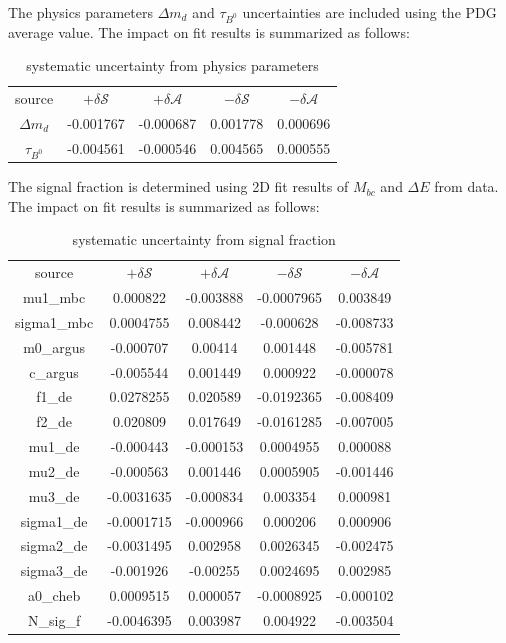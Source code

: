 The physics parameters $\Delta m_d$ and $\tau_{B^0}$ uncertainties are included using the PDG average value. The impact on fit results is summarized as follows: 
\begin{table}[H]
	\begin{minipage}[b]{1.0\linewidth}
		\centering
		\caption{systematic uncertainty from  physics parameters}
		\begin{tabular}{c c c c c}
			\hline
			source & $+\delta \mathcal{S}$ & $+\delta \mathcal{A}$ & $-\delta \mathcal{S}$ &  $-\delta \mathcal{A}$\\
			$\Delta m_d$  & -0.001767
			& -0.000687
			& 0.001778
			& 0.000696
			\\
			$\tau_{B^0}$  & -0.004561
			& -0.000546
			& 0.004565
			& 0.000555
			\\
			\hline
		\end{tabular}
	\end{minipage}
\end{table}
The signal fraction is determined using 2D fit results of $M_{bc}$ and $\Delta E$ from data. The impact on fit results is summarized as follows: 
\begin{table}[H]
	\begin{minipage}[b]{1.0\linewidth}
		\centering
		\caption{systematic uncertainty from  signal fraction}
		\begin{tabular}{c c c c c}
			\hline
			source & $+\delta \mathcal{S}$ & $+\delta \mathcal{A}$ & $-\delta \mathcal{S}$ &  $-\delta \mathcal{A}$\\
			mu1\_mbc  & 0.000822 &	-0.003888&	-0.0007965&	0.003849
			\\
			sigma1\_mbc & 0.0004755&	0.008442&	-0.000628&	-0.008733
			\\
			m0\_argus & -0.000707&	0.00414	&0.001448&	-0.005781
			\\
			c\_argus & -0.005544&	0.001449&	0.000922&	-0.000078\\
			f1\_de & 0.0278255 &	0.020589&	-0.0192365	&-0.008409
			\\
			f2\_de & 0.020809&	0.017649	&-0.0161285	&-0.007005
			\\
			mu1\_de & -0.000443&	-0.000153&	0.0004955&	0.000088\\
			mu2\_de & -0.000563&	0.001446&	0.0005905&	-0.001446
			\\
			mu3\_de & -0.0031635&	-0.000834&	0.003354&	0.000981
			\\
			sigma1\_de& -0.0001715&	-0.000966&	0.000206&	0.000906
			\\
			sigma2\_de& -0.0031495&	0.002958&	0.0026345&	-0.002475
			\\
			sigma3\_de& -0.001926&	-0.00255&	0.0024695&	0.002985
			\\
			a0\_cheb & 0.0009515&	0.000057&	-0.0008925&	-0.000102
			\\
			N\_sig\_f & -0.0046395&	0.003987&	0.004922&	-0.003504
			\\
			\hline
		\end{tabular}
	\end{minipage}
\end{table}
